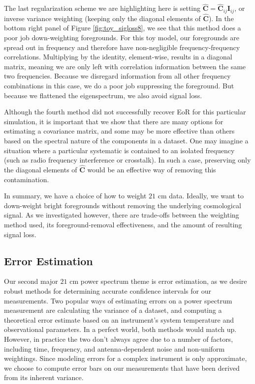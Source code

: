 \documentclass[preprint2,numberedappendix,tighten]{aastex6}  %
\begin{document}
The last regularization scheme we are highlighting here is setting $\hat{\textbf{C}} = \hat{\textbf{C}}_{ij}\textbf{I}_{ij}$, or inverse variance weighting (keeping only the diagonal elements of $\hat{\textbf{C}}$). In the bottom right panel of Figure \ref{fig:toy_sigloss8}, we see that this method does a poor job down-weighting foregrounds. For this toy model, our foregrounds are spread out in frequency and therefore have non-negligible frequency-frequency correlations. Multiplying by the identity, element-wise, results in a diagonal matrix, meaning we are only left with correlation information between the same two frequencies. Because we disregard information from all other frequency combinations in this case, we do a poor job suppressing the foreground. But because we flattened the eigenspectrum, we also avoid signal loss. 

Although the fourth method did not successfully recover EoR for this particular simulation, it is important that we show that there are many options for estimating a covariance matrix, and some may be more effective than others based on the spectral nature of the components in a dataset. One may imagine a situation where a particular systematic is contained to an isolated frequency (such as radio frequency interference or crosstalk). In such a case, preserving only the diagonal elements of $\hat{\textbf{C}}$ would be an effective way of removing this contamination. 

In summary, we have a choice of how to weight $21$ cm data. Ideally, we want to down-weight bright foregrounds without removing the underlying cosmological signal. As we investigated however, there are trade-offs between the weighting method used, its foreground-removal effectiveness, and the amount of resulting signal loss. 


\subsection{Error Estimation}
\label{sec:ErrorOverview}

Our second major $21$ cm power spectrum theme is error estimation, as we desire robust methods for determining accurate confidence intervals for our measurements. Two popular ways of estimating errors on a power spectrum measurement are calculating the variance of a dataset, and computing a theoretical error estimate based on an instrument's system temperature and observational parameters. In a perfect world, both methods would match up. However, in practice the two don't always agree due to a number of factors, including time, frequency, and antenna-dependent noise and non-uniform weightings. Since modeling errors for a complex instrument is only approximate, we choose to compute error bars on our measurements that have been derived from its inherent variance.
\end{document}
